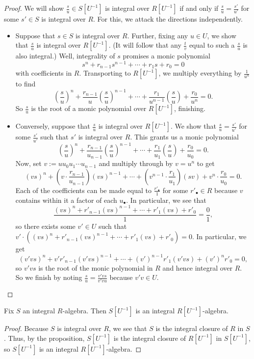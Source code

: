\begin{proof}
	We will show $\frac su\in S\left[U^{-1}\right]$ is integral over $R\left[U^{-1}\right]$ if and only if $\frac su=\frac{s'}{u'}$ for some $s'\in S$ is integral over $R$. For this, we attack the directions independently.
	\begin{itemize}
		\item Suppose that $s\in S$ is integral over $R$. Further, fixing any $u\in U$, we show that $\frac su$ is integral over $R\left[U^{-1}\right]$. (It will follow that any $\frac tv$ equal to such a $\frac su$ is also integral.) Well, integrality of $s$ promises a monic polynomial
		\[s^n+r_{n-1}s^{n-1}+\cdots+r_1s+r_0=0\]
		with coefficients in $R$. Transporting to $R\left[U^{-1}\right]$, we multiply everything by $\frac1{u^n}$ to find
		\[\left(\frac su\right)^n+\frac{r_{n-1}}u\left(\frac su\right)^{n-1}+\cdots+\frac{r_1}{u^{n-1}}\left(\frac su\right)+\frac{r_0}{u^n}=0.\]
		So $\frac su$ is the root of a monic polynomial over $R\left[U^{-1}\right]$, finishing.
		\item Conversely, suppose that $\frac su$ is integral over $R\left[U^{-1}\right]$. We show that $\frac su=\frac{s'}{u'}$ for some $\frac{s'}{u'}$ such that $s'$ is integral over $R$. This grants us a monic polynomial
		\[\left(\frac su\right)^n+\frac{r_{n-1}}{u_{n-1}}\left(\frac su\right)^{n-1}+\cdots+\frac{r_1}{u_1}\left(\frac su\right)+\frac{r_0}{u_0}=0.\]
		Now, set $v:=uu_0u_1\cdots u_{n-1}$ and multiply through by $v=u^n$ to get
		\[(vs)^n+\left(v\cdot\frac{r_{n-1}}{u_{n-1}}\right)(vs)^{n-1}+\cdots+\left(v^{n-1}\cdot\frac{r_1}{u_1}\right)(sv)+v^n\cdot\frac{r_0}{u_0}=0.\]
		Each of the coefficients can be made equal to $\frac{r'_\bullet}1$ for some $r'_\bullet\in R$ because $v$ contains within it a factor of each $u_\bullet$. In particular, we see that
		\[\frac{(vs)^n+r'_{n-1}(vs)^{n-1}+\cdots+r'_1(vs)+r'_0}1=\frac01,\]
		so there exists some $v'\in U$ such that $v'\cdot\left((vs)^n+r'_{n-1}(vs)^{n-1}+\cdots+r'_1(vs)+r'_0\right)=0$. In particular, we get
		\[(v'vs)^n+v'r'_{n-1}(v'vs)^{n-1}+\cdots+(v')^{n-1}r'_1(v'vs)+(v')^nr'_0=0,\]
		so $v'vs$ is the root of the monic polynomial in $R$ and hence integral over $R$. So we finish by noting $\frac su=\frac{v'vs}{v'vu}$ because $v'v\in U$.
		\qedhere
	\end{itemize}
\end{proof}
\begin{corollary} \label{cor:localizeintegral}
	Fix $S$ an integral $R$-algebra. Then $S\left[U^{-1}\right]$ is an integral $R\left[U^{-1}\right]$-algebra.
\end{corollary}
\begin{proof}
	Because $S$ is integral over $R$, we see that $S$ is the integral closure of $R$ in $S$. Thus, by the proposition, $S\left[U^{-1}\right]$ is the integral closure of $R\left[U^{-1}\right]$ in $S\left[U^{-1}\right]$, so $S\left[U^{-1}\right]$ is an integral $R\left[U^{-1}\right]$-algebra.
\end{proof}

